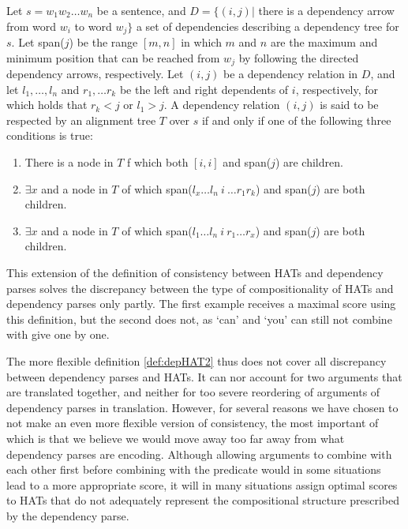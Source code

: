 \documentclass[hidelinks]{report}
\begin{document}
\begin{definition}[]\label{def:depHAT2}
Let $s = w_1 w_2 \dots w_n$ be a sentence, and $D = \{ (i,j) |$ there is a dependency arrow from word $w_i$ to word $w_j \}$ a set of dependencies describing a dependency tree for $s$. Let span($j$) be the range $[m,n]$ in which $m$ and $n$ are the maximum and minimum position that can be reached from $w_j$ by following the directed dependency arrows, respectively. Let $(i,j)$ be a dependency relation in $D$, and let $l_1,\ldots,l_n$ and $r_1,\ldots r_k$ be the left and right dependents of $i$, respectively, for which holds that $r_k < j$ or $l_1 > j$. A dependency relation $(i,j)$ is said to be respected by an alignment tree $T$ over $s$ if and only if one of the following three conditions is true: \begin{enumerate}
\item There is a node in $T$ f which both $[i,i]$ and span($j$) are children.
\item $\exists x$  and a node in $T$ of which span($l_x\ldots l_n~i~\ldots r_1 r_k$) and span($j$) are both children.
\item $\exists x$  and a node in $T$ of which span($l_1\ldots l_n~i~r_1\ldots r_x$) and span($j$) are both children.
\end{enumerate} 
\end{definition}

This extension of the definition of consistency between HATs and dependency parses solves the discrepancy between the type of compositionality of HATs and dependency parses only partly. The first example receives a maximal score using this definition, but the second does not, as `can' and `you' can still not combine with give one by one. 

The more flexible definition \ref{def:depHAT2} thus does not cover all discrepancy between dependency parses and HATs. It can nor account for two arguments that are translated together, and neither for too severe reordering of arguments of dependency parses in translation. However, for several reasons we have chosen to not make an even more flexible version of consistency, the most important of which is that we believe we would move away too far away from what dependency parses are encoding. Although allowing arguments to combine with each other first before combining with the predicate would in some situations lead to a more appropriate score, it will in many situations assign optimal scores to HATs that do not adequately represent the compositional structure prescribed by the dependency parse.
\end{document}
